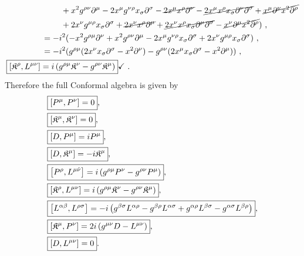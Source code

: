 \documentclass[12pt,a4paper]{report}
\begin{document}
\begin{align*}
    &~~~~~~~+x^2g^{{\rho}{\nu}}\partial^{{\mu}}-2x^{{\mu}}g^{{\nu}{\rho}}x_{{\sigma}}\partial^{{\sigma}}-\cancel{2x^{{\mu}}x^{{\rho}}\partial^{{\nu}}}-\cancel{2x^{{\mu}}x^{{\rho}}x_{{\sigma}}\partial^{{\nu}}\partial^{{\sigma}}}+\cancel{x^{{\mu}}\partial^{{\nu}}x^2\partial^{{\rho}}}\nonumber\\
    &~~~~~~~+2x^{{\nu}}g^{{\mu}{\rho}}x_{{\sigma}}\partial^{{\sigma}}+\cancel{2x^{{\nu}}x^{{\rho}}\partial^{{\mu}}}+\cancel{2x^{{\nu}}x^{{\rho}}x_{{\sigma}}\partial^{{\mu}}\partial^{{\sigma}}}-\cancel{x^{{\nu}}\partial^{{\mu}}x^2\partial^{{\rho}}})~,\\
    &=-i^2(-x^2g^{{\rho}{\mu}}\partial^{{\nu}}+x^2g^{{\rho}{\nu}}\partial^{{\mu}}-2x^{{\mu}}g^{{\nu}{\rho}}x_{{\sigma}}\partial^{{\sigma}}+2x^{{\nu}}g^{{\mu}{\rho}}x_{{\sigma}}\partial^{{\sigma}})~,\\
    &=-i^2(g^{{\rho}{\mu}}(2x^{{\nu}}x_{{\sigma}}\partial^{{\sigma}}-x^2\partial^{{\nu}})-g^{{\rho}{\nu}}(2x^{{\mu}}x_{{\sigma}}\partial^{{\sigma}}-x^2\partial^{{\mu}}))~,\\
    \Aboxed{\left[\mathfrak{K}^{{\rho}},L^{{\mu}{\nu}}\right]&=i\left(g^{{\rho}{\mu}}\mathfrak{K}^{{\nu}}-g^{{\rho}{\nu}}\mathfrak{K}^{{\mu}}\right)}\checkmark~.
\end{align*}
Therefore the full Conformal algebra is given by
\begin{align*}
    \Aboxed{&\left[P^{{\mu}},P^{{\nu}}\right]=0},\\
    \Aboxed{&\left[\mathfrak{K}^{{\mu}},\mathfrak{K}^{{\nu}}\right]=0},\\
 \Aboxed{&\left[D, P^{{\mu}}\right]=iP^{{\mu}}},\\
 \Aboxed{&\left[D, \mathfrak{K}^{{\mu}}\right]=-i\mathfrak{K}^{{\mu}}},\\
 \Aboxed{&\left[P^{{\rho}},L^{{\mu}\hat{\nu}}\right]=i\left(g^{{\rho}{\mu}}P^{{\nu}}-g^{{\rho}{\nu}}P^{{\mu}}\right)},\\
 \Aboxed{&\left[\mathfrak{K}^{{\rho}},L^{{\mu}{\nu}}\right]=i\left(g^{{\rho}{\mu}}\mathfrak{K}^{{\nu}}-g^{{\rho}{\nu}}\mathfrak{K}^{{\mu}}\right)},\\
 \Aboxed{&\left[L^{{\alpha}{\beta}},L^{{\rho}{\sigma}}\right]=-i\left(g^{{\beta}{\sigma}}L^{{\alpha}{\rho}}-g^{{\beta}{\rho}}L^{{\alpha}{\sigma}}+g^{{\alpha}{\rho}}L^{{\beta}{\sigma}}-g^{{\alpha}{\sigma}}L^{{\beta}{\rho}}\right)},\\
 \Aboxed{&\left[\mathfrak{K}^{{\mu}},P^{{\nu}}\right]=2i\left(g^{{\mu}{\nu}}D-L^{{\mu}{\nu}}\right)},\\
 \Aboxed{&\left[D, L^{{\mu}{\nu}}\right]=0}.
\end{align*}
\end{document}
